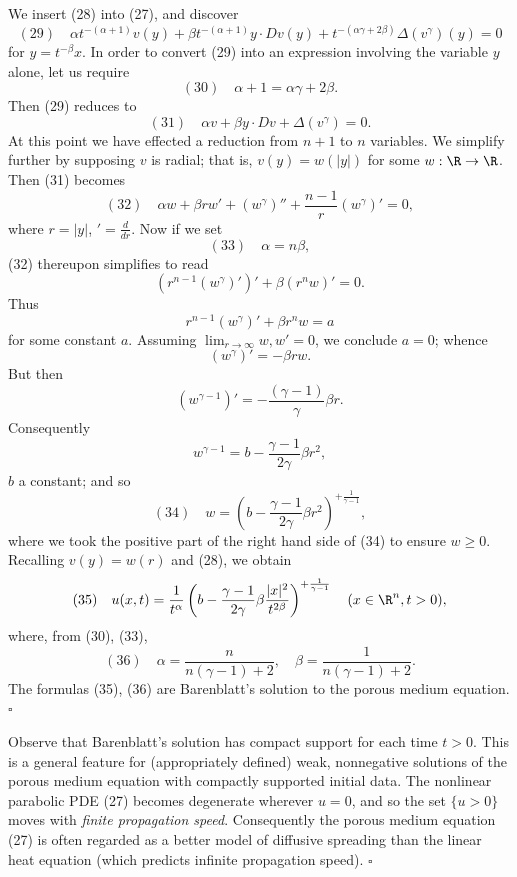 \begin{example}
We insert (28) into (27), and discover
$$(29) \quad \alpha t^{-(\alpha+1)} v(y) + \beta t^{-(\alpha+1)} y\cdot Dv(y) + t^{-(\alpha\gamma+2\beta)} \Delta(v^\gamma)(y) = 0$$
for $y = t^{-\beta}x$. In order to convert (29) into an expression involving the variable $y$ alone, let us require
$$(30) \quad \alpha + 1 = \alpha\gamma + 2\beta.$$
Then (29) reduces to
$$(31) \quad \alpha v + \beta y\cdot Dv + \Delta(v^\gamma) = 0.$$
At this point we have effected a reduction from $n+1$ to $n$ variables. We simplify further by supposing $v$ is radial; that is, $v(y) = w(|y|)$ for some $w:\R\to\R$. Then (31) becomes
$$(32) \quad \alpha w + \beta r w' + (w^\gamma)'' + \frac{n-1}{r}(w^\gamma)' = 0,$$
where $r=|y|$, $' = \frac{d}{dr}$. Now if we set
$$(33) \quad \alpha = n\beta,$$
(32) thereupon simplifies to read
$$(r^{n-1}(w^\gamma)')' + \beta(r^n w)' = 0.$$
Thus
$$r^{n-1}(w^\gamma)' + \beta r^n w = a$$
for some constant $a$. Assuming $\lim_{r\to\infty} w, w' = 0$, we conclude $a=0$; whence
$$(w^\gamma)' = -\beta r w.$$
But then
$$(w^{\gamma-1})' = -\frac{(\gamma-1)}{\gamma}\beta r.$$
Consequently
$$w^{\gamma-1} = b - \frac{\gamma-1}{2\gamma}\beta r^2,$$
$b$ a constant; and so
$$(34) \quad w = \left(b - \frac{\gamma-1}{2\gamma}\beta r^2\right)^{+\frac{1}{\gamma-1}},$$
where we took the positive part of the right hand side of (34) to ensure $w\ge 0$. Recalling $v(y)=w(r)$ and (28), we obtain
$$(35) \quad u(x,t) = \frac{1}{t^\alpha}\left(b - \frac{\gamma-1}{2\gamma}\beta\frac{|x|^2}{t^{2\beta}}\right)^{+\frac{1}{\gamma-1}} \quad (x\in\R^n, t>0),$$
where, from (30), (33),
$$(36) \quad \alpha = \frac{n}{n(\gamma-1)+2}, \quad \beta = \frac{1}{n(\gamma-1)+2}.$$
The formulas (35), (36) are Barenblatt's solution to the porous medium equation. $\square$
\end{example}

\begin{remark}
\label{rem:porous-medium-finite-propagation-speed}
Observe that Barenblatt's solution has compact support for each time $t>0$. This is a general feature for (appropriately defined) weak, nonnegative solutions of the porous medium equation with compactly supported initial data. The nonlinear parabolic PDE (27) becomes degenerate wherever $u=0$, and so the set $\{u>0\}$ moves with \textit{finite propagation speed}. Consequently the porous medium equation (27) is often regarded as a better model of diffusive spreading than the linear heat equation (which predicts infinite propagation speed). $\square$
\end{remark}

